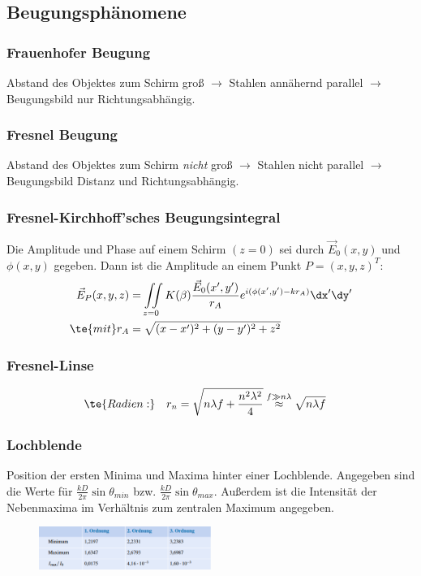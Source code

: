\documentclass[twocolumn, unnumberedsubsub]{summery_5.0} %
\begin{document}
\subsection{Beugungsphänomene}
\subsubsection*{Frauenhofer Beugung}
Abstand des Objektes zum Schirm  gro{\ss} \(\to\) Stahlen annähernd parallel
\(\to\) Beugungsbild nur Richtungsabhängig.

\subsubsection{Fresnel Beugung}
Abstand des Objektes zum Schirm \emph{nicht} gro{\ss} \(\to\) 
Stahlen nicht parallel \(\to\) Beugungsbild Distanz und Richtungsabhängig.

\subsubsection{Fresnel-Kirchhoff'sches Beugungsintegral}
Die Amplitude und Phase auf einem Schirm \((z=0)\) sei durch \(\vec E_0(x,y)\) 
und \(\phi(x,y)\) gegeben. Dann ist die Amplitude an einem
Punkt $P=(x,y,z)^T$:
\begin{align*}
    \vec E_P(x,y,z) &= \iint\limits_{z=0} K(\beta)\frac{\vec E_0(x',y')}{r_A} 
    e^{i(\phi(x',y') - k r_A)} \dx'\dy'\\
    \te{mit } r_A &= \sqrt{(x-x')^2 + (y-y')^2 + z^2}
\end{align*}

\subsubsection{Fresnel-Linse}\tight
\begin{align*}
        &\te{Radien:}  & r_n &= 
        \sqrt{n\lambda f + \frac{n^2\lambda^2}4} \overset{f\gg n\lambda}{\approx} \sqrt{n\lambda f}
\end{align*}

\subsubsection{Lochblende}
Position der ersten Minima und Maxima hinter einer Lochblende. 
Angegeben sind die Werte für $\frac{k D}{2\pi} \sin \theta_{min}$ bzw. 
$\frac{k D}{2\pi} \sin \theta_{max}$. 
Au{\ss}erdem ist die Intensität der Nebenmaxima im Verhältnis zum zentralen
Maximum angegeben.
\begin{figure}[H]
    \centering
    \includegraphics[width=0.5\textwidth]{2.png}
\end{figure}
\end{document}
